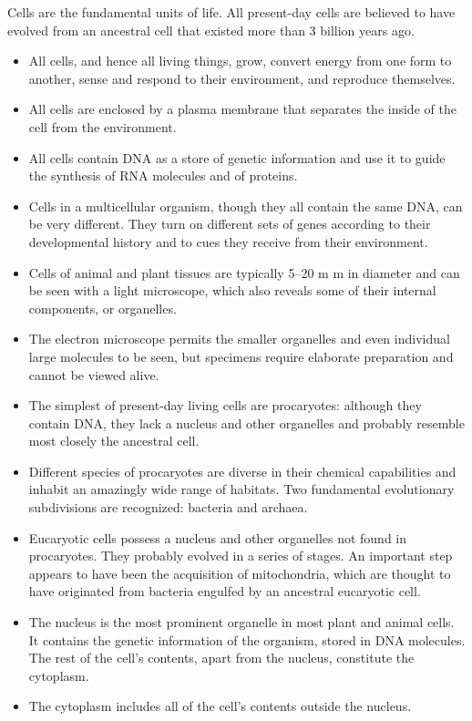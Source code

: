 Cells are the fundamental units of life. All present-day cells are
believed to have evolved from an ancestral cell that existed more
than 3 billion years ago.
\begin{itemize}
\item All cells, and hence all living things, grow, convert energy from one
form to another, sense and respond to their environment, and reproduce themselves.
\item All cells are enclosed by a plasma membrane that separates the inside
of the cell from the environment.
\item All cells contain DNA as a store of genetic information and use it to
guide the synthesis of RNA molecules and of proteins.
\item Cells in a multicellular organism, though they all contain the same
DNA, can be very different. They turn on different sets of genes
according to their developmental history and to cues they receive
from their environment.
\item Cells of animal and plant tissues are typically 5–20 m m in diameter
and can be seen with a light microscope, which also reveals some of
their internal components, or organelles.
\item The electron microscope permits the smaller organelles and even
individual large molecules to be seen, but specimens require elaborate preparation and cannot be viewed alive.
\item The simplest of present-day living cells are procaryotes: although
they contain DNA, they lack a nucleus and other organelles and probably resemble most closely the ancestral cell.
\item Different species of procaryotes are diverse in their chemical
capabilities and inhabit an amazingly wide range of habitats. Two
fundamental evolutionary subdivisions are recognized: bacteria and
archaea.
\item Eucaryotic cells possess a nucleus and other organelles not found in
procaryotes. They probably evolved in a series of stages. An important step appears to have been the acquisition of mitochondria, which
are thought to have originated from bacteria engulfed by an ancestral
eucaryotic cell.
\item The nucleus is the most prominent organelle in most plant and animal cells. It contains the genetic information of the organism, stored
in DNA molecules. The rest of the cell’s contents, apart from the
nucleus, constitute the cytoplasm.
\item The cytoplasm includes all of the cell’s contents outside the nucleus.

\end{itemize}
